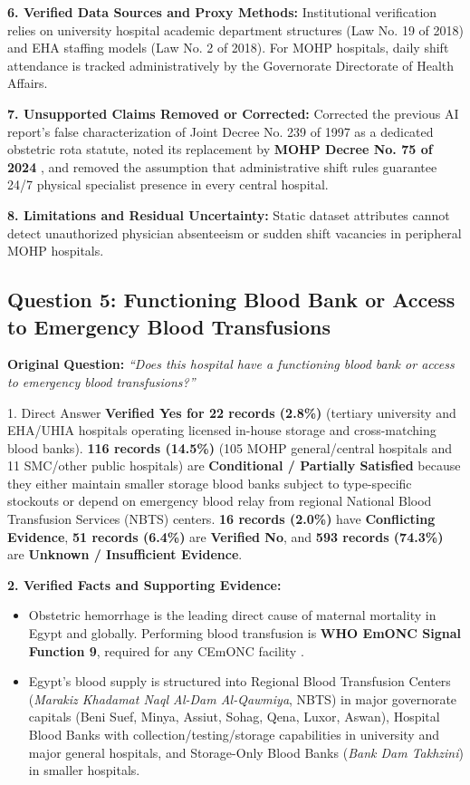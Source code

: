 \documentclass[10pt,a4paper]{article}
\begin{document}
\textbf{6. Verified Data Sources and Proxy Methods:}
Institutional verification relies on university hospital academic department structures (Law No. 19 of 2018) and EHA staffing models (Law No. 2 of 2018). For MOHP hospitals, daily shift attendance is tracked administratively by the Governorate Directorate of Health Affairs.

\textbf{7. Unsupported Claims Removed or Corrected:}
Corrected the previous AI report's false characterization of Joint Decree No. 239 of 1997 as a dedicated obstetric rota statute, noted its replacement by \textbf{MOHP Decree No. 75 of 2024} \cite{egypt_mohp_decree_75_2024}, and removed the assumption that administrative shift rules guarantee 24/7 physical specialist presence in every central hospital.

\textbf{8. Limitations and Residual Uncertainty:}
Static dataset attributes cannot detect unauthorized physician absenteeism or sudden shift vacancies in peripheral MOHP hospitals.

\subsection{Question 5: Functioning Blood Bank or Access to Emergency Blood Transfusions}
\textbf{Original Question:} \textit{``Does this hospital have a functioning blood bank or access to emergency blood transfusions?''}

\begin{auditbox}{1. Direct Answer}
\textbf{Verified Yes for 22 records (2.8\%)} (tertiary university and EHA/UHIA hospitals operating licensed in-house storage and cross-matching blood banks). \textbf{116 records (14.5\%)} (105 MOHP general/central hospitals and 11 SMC/other public hospitals) are \textbf{Conditional / Partially Satisfied} because they either maintain smaller storage blood banks subject to type-specific stockouts or depend on emergency blood relay from regional National Blood Transfusion Services (NBTS) centers. \textbf{16 records (2.0\%)} have \textbf{Conflicting Evidence}, \textbf{51 records (6.4\%)} are \textbf{Verified No}, and \textbf{593 records (74.3\%)} are \textbf{Unknown / Insufficient Evidence}.
\end{auditbox}

\textbf{2. Verified Facts and Supporting Evidence:}
\begin{itemize}
    \item Obstetric hemorrhage is the leading direct cause of maternal mortality in Egypt and globally. Performing blood transfusion is \textbf{WHO EmONC Signal Function 9}, required for any CEmONC facility \cite{who2009emonc}.
    \item Egypt's blood supply is structured into Regional Blood Transfusion Centers (\textit{Marakiz Khadamat Naql Al-Dam Al-Qawmiya}, NBTS) in major governorate capitals (Beni Suef, Minya, Assiut, Sohag, Qena, Luxor, Aswan), Hospital Blood Banks with collection/testing/storage capabilities in university and major general hospitals, and Storage-Only Blood Banks (\textit{Bank Dam Takhzini}) in smaller hospitals.
\end{itemize}
\end{document}
